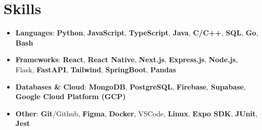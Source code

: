 \documentclass[letterpaper,10pt]{article}
\newcommand{\resumeItem}[1]{
  \item\small{
    {#1 \vspace{-1pt}}
  }
}
\newcommand{\resumeItemListStart}{\begin{itemize}[label=$\bullet$, itemsep=0pt, topsep=0pt, parsep=0pt]}
\newcommand{\resumeItemListEnd}{\end{itemize}\vspace{-2pt}}
\begin{document}
\section{Skills}
\resumeItemListStart
  \resumeItem{\textbf{Languages}{: \textbf{Python}, \textbf{JavaScript}, \textbf{TypeScript}, \textbf{Java}, \textbf{C/C++}, \textbf{SQL}, \textbf{Go}, \textbf{Bash}}}
  \resumeItem{\textbf{Frameworks}{: \textbf{React}, \textbf{React Native}, \textbf{Next.js}, \textbf{Express.js}, \textbf{Node.js}, Flask, \textbf{FastAPI}, \textbf{Tailwind}, \textbf{SpringBoot}, \textbf{Pandas}}}
  \resumeItem{\textbf{Databases \& Cloud}{: \textbf{MongoDB}, \textbf{PostgreSQL}, \textbf{Firebase}, \textbf{Supabase}, \textbf{Google Cloud Platform (GCP)}}}
  \resumeItem{\textbf{Other}{: \textbf{Git}/Github, \textbf{Figma}, \textbf{Docker}, VSCode, \textbf{Linux}, \textbf{Expo SDK}, \textbf{JUnit}, \textbf{Jest}}}
\resumeItemListEnd
\end{document}
